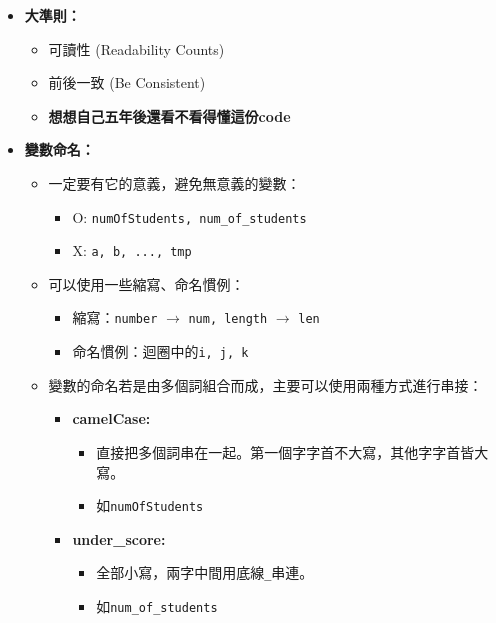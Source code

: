 \documentclass[a4paper, 11pt, oneside]{book}
\begin{document}
\begin{itemize}
    \item \textbf{大準則：}
    \begin{itemize}
        \item 可讀性 (Readability Counts)
        \item 前後一致 (Be Consistent)
        \item \textbf{想想自己五年後還看不看得懂這份code}
    \end{itemize}
    \item \textbf{變數命名：}
    \begin{itemize}
        \item 一定要有它的意義，避免無意義的變數：
        \begin{itemize}
            \item O: \texttt{numOfStudents, num\_of\_students}
            \item X: \texttt{a, b, ..., tmp}
        \end{itemize}
        \item 可以使用一些縮寫、命名慣例：
        \begin{itemize}
            \item 縮寫：\texttt{number}  $\rightarrow$ \texttt{num, length} $\rightarrow$ \texttt{len}
            \item 命名慣例：迴圈中的\texttt{i, j, k}
        \end{itemize}
        \item 變數的命名若是由多個詞組合而成，主要可以使用兩種方式進行串接：
        \begin{itemize}
            \item \textbf{camelCase: }
            \begin{itemize}
                \item 直接把多個詞串在一起。第一個字字首不大寫，其他字字首皆大寫。
                \item 如\texttt{numOfStudents}
            \end{itemize}
            \item \textbf{under\_score: }
            \begin{itemize}
                \item 全部小寫，兩字中間用底線\texttt{\_}串連。
                \item 如\texttt{num\_of\_students}
            \end{itemize}
        \end{itemize}
    \end{itemize}

\end{itemize}
\end{document}
